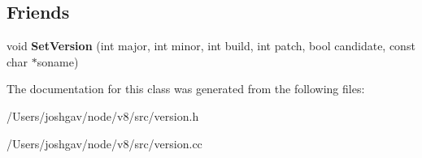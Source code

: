 \subsection*{Friends}
\begin{DoxyCompactItemize}
\item 
void {\bfseries Set\+Version} (int major, int minor, int build, int patch, bool candidate, const char $\ast$soname)\hypertarget{classv8_1_1internal_1_1_version_a8cf6f34703ea4ad8ddf5df52abec6592}{}\label{classv8_1_1internal_1_1_version_a8cf6f34703ea4ad8ddf5df52abec6592}

\end{DoxyCompactItemize}


The documentation for this class was generated from the following files\+:\begin{DoxyCompactItemize}
\item 
/\+Users/joshgav/node/v8/src/version.\+h\item 
/\+Users/joshgav/node/v8/src/version.\+cc\end{DoxyCompactItemize}

